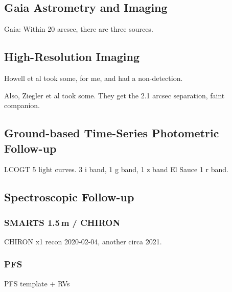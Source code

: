 \documentclass[12pt,twocolumn,tighten]{aastex63}
\begin{document}
  \subsection{Gaia Astrometry and Imaging}
  \label{subsec:gaia}
  Gaia:
    Within 20 arcsec, there are three sources. 






  \subsection{High-Resolution Imaging}
  \label{subsec:speckle}
  Howell et al took some, for me, and had a non-detection.

  Also, Ziegler et al took some.
    They get the 2.1 arcsec separation, faint companion.

  \subsection{Ground-based Time-Series Photometric Follow-up}
  \label{subsec:groundphot}
  LCOGT
    5 light curves. 3 i band, 1 g band, 1 z band
  El Sauce
    1 r band.

  \subsection{Spectroscopic Follow-up}
  \label{subsec:spectra}

  \subsubsection{SMARTS 1.5$\,$m / CHIRON}
  \label{subsec:chiron}
  CHIRON x1 recon 2020-02-04, another circa 2021.

  \subsubsection{PFS}
  PFS template + RVs
\end{document}
